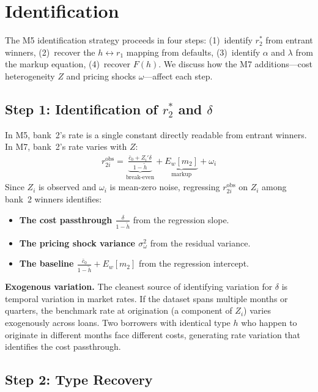\documentclass[12pt]{article}
\theoremstyle{plain}
\theoremstyle{plain}
\theoremstyle{definition}  %
\theoremstyle{remark}  %
\begin{document}
\section{Identification}\label{sec:id_implications}

The M5 identification strategy proceeds in four steps: (1)~identify $r_2^*$ from entrant winners, (2)~recover the $h \leftrightarrow r_1$ mapping from defaults, (3)~identify $\alpha$ and $\lambda$ from the markup equation, (4)~recover $F(h)$. We discuss how the M7 additions---cost heterogeneity $Z$ and pricing shocks $\omega$---affect each step.

\subsection{Step 1: Identification of $r_2^*$ and $\delta$}

In M5, bank~2's rate is a single constant directly readable from entrant winners. In M7, bank~2's rate varies with $Z$:
\begin{align*}
    r_{2i}^{\text{obs}} = \underbrace{\frac{\bar{c}_0 + Z_i'\delta}{1 - \tilde{h}}}_{\text{break-even}} + \underbrace{E_w[m_2]}_{\text{markup}} + \omega_i
\end{align*}
Since $Z_i$ is observed and $\omega_i$ is mean-zero noise, regressing $r_{2i}^{\text{obs}}$ on $Z_i$ among bank~2 winners identifies:
\begin{itemize}
    \item \textbf{The cost passthrough $\frac{\delta}{1-\tilde{h}}$} from the regression slope.
    \item \textbf{The pricing shock variance $\sigma_\omega^2$} from the residual variance.
    \item \textbf{The baseline $\frac{\bar{c}_0}{1-\tilde{h}} + E_w[m_2]$} from the regression intercept.
\end{itemize}

\medskip\noindent
\textbf{Exogenous variation.} The cleanest source of identifying variation for $\delta$ is temporal variation in market rates. If the dataset spans multiple months or quarters, the benchmark rate at origination (a component of $Z_i$) varies exogenously across loans. Two borrowers with identical type $h$ who happen to originate in different months face different costs, generating rate variation that identifies the cost passthrough.

\subsection{Step 2: Type Recovery}
\end{document}
